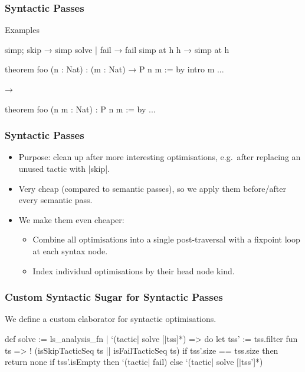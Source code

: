 \begin{frame}[fragile]
  \frametitle{Syntactic Passes}

  \begin{block}{Examples}
    \begin{leancode}
      simp; skip     →   simp
      solve | fail   →   fail
      simp at h h    →   simp at h
    \end{leancode}

    \pause

    \begin{leancode}
      theorem foo (n : Nat) : (m : Nat) → P n m := by
        intro m
        ...

      →

      theorem foo (n m : Nat) : P n m := by
        ...
    \end{leancode}
  \end{block}
\end{frame}

\begin{frame}
  \frametitle{Syntactic Passes}

  \begin{itemize}
    \item Purpose: clean up after more interesting optimisations, e.g.\ after replacing an unused tactic with \lean|skip|.
    \item Very cheap (compared to semantic passes), so we apply them before/after every semantic pass.
    \item We make them even cheaper:
      \begin{itemize}
        \item Combine all optimisations into a single post-traversal with a fixpoint loop at each syntax node.
        \item Index individual optimisations by their head node kind.
      \end{itemize}
  \end{itemize}
\end{frame}

\begin{frame}[fragile]
  \frametitle{Custom Syntactic Sugar for Syntactic Passes}

  We define a custom elaborator for syntactic optimisations.

  \begin{leancode}
    def solve := ls_analysis_fn%
      | `(tactic| solve $[| $tss]*) => do
        let tss' := tss.filter fun ts =>
          ! (isSkipTacticSeq ts || isFailTacticSeq ts)
        if tss'.size == tss.size then
          return none
        if tss'.isEmpty then
          `(tactic| fail)
        else
          `(tactic| solve $[| $tss']*)
  \end{leancode}
\end{frame}

